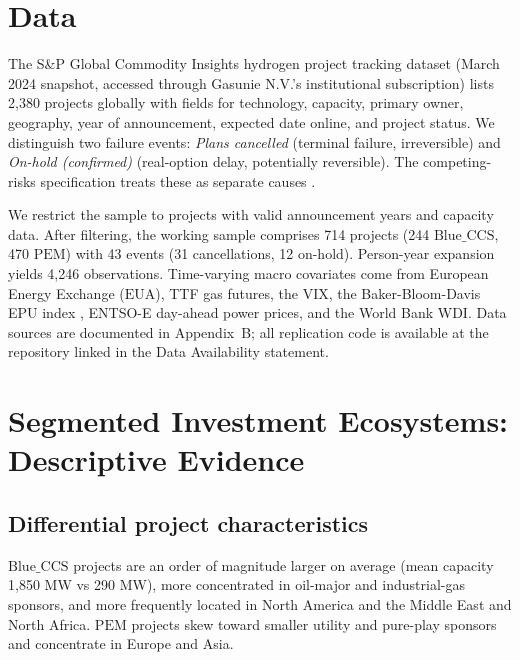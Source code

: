 \documentclass[review,authoryear,11pt]{elsarticle}
\newcommand{\BlueCCS}{\mathrm{Blue\_CCS}}
\newcommand{\PEM}{\mathrm{PEM}}
\newcommand{\EUA}{\mathrm{EUA}}
\begin{document}
\section{Data}

The S\&P Global Commodity Insights hydrogen project tracking dataset \citep{SPGlobal2024} (March 2024 snapshot, accessed through Gasunie N.V.'s institutional subscription) lists 2,380 projects globally with fields for technology, capacity, primary owner, geography, year of announcement, expected date online, and project status. We distinguish two failure events: \textit{Plans cancelled} (terminal failure, irreversible) and \textit{On-hold (confirmed)} (real-option delay, potentially reversible). The competing-risks specification treats these as separate causes \citep{FineGray1999}.

We restrict the sample to projects with valid announcement years and capacity data. After filtering, the working sample comprises 714 projects (244 $\BlueCCS$, 470 $\PEM$) with 43 events (31 cancellations, 12 on-hold). Person-year expansion \citep{Allison2014, SingerWillett2003} yields 4,246 observations. Time-varying macro covariates come from European Energy Exchange ($\EUA$), TTF gas futures, the VIX, the Baker-Bloom-Davis EPU index \citep{BakerBloomDavis2016}, ENTSO-E day-ahead power prices, and the World Bank WDI. Data sources are documented in Appendix~B; all replication code is available at the repository linked in the Data Availability statement.

\section{Segmented Investment Ecosystems: Descriptive Evidence}

\subsection{Differential project characteristics}

$\BlueCCS$ projects are an order of magnitude larger on average (mean capacity 1{,}850 MW vs 290 MW), more concentrated in oil-major and industrial-gas sponsors, and more frequently located in North America and the Middle East and North Africa. $\PEM$ projects skew toward smaller utility and pure-play sponsors and concentrate in Europe and Asia.
\end{document}
